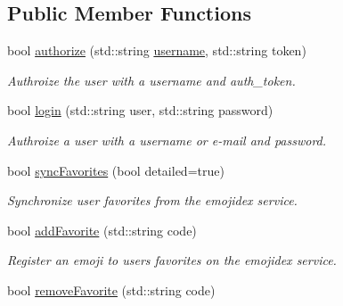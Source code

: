 \subsection*{Public Member Functions}
\begin{DoxyCompactItemize}
\item 
bool \hyperlink{classEmojidex_1_1Service_1_1User_a909f2f2858ed1978476fcc9e2f7b32c5}{authorize} (std\+::string \hyperlink{classEmojidex_1_1Service_1_1User_a5bb9d033735aa9f82fa666f811f48743}{username}, std\+::string token)\hypertarget{classEmojidex_1_1Service_1_1User_a909f2f2858ed1978476fcc9e2f7b32c5}{}\label{classEmojidex_1_1Service_1_1User_a909f2f2858ed1978476fcc9e2f7b32c5}

\begin{DoxyCompactList}\small\item\em Authroize the user with a username and auth\+\_\+token. \end{DoxyCompactList}\item 
bool \hyperlink{classEmojidex_1_1Service_1_1User_a44800534bd40a64caf35fc5fb93298c5}{login} (std\+::string user, std\+::string password)\hypertarget{classEmojidex_1_1Service_1_1User_a44800534bd40a64caf35fc5fb93298c5}{}\label{classEmojidex_1_1Service_1_1User_a44800534bd40a64caf35fc5fb93298c5}

\begin{DoxyCompactList}\small\item\em Authroize a user with a username or e-\/mail and password. \end{DoxyCompactList}\item 
bool \hyperlink{classEmojidex_1_1Service_1_1User_a4fd708d672d09325c07b72bae81bab10}{sync\+Favorites} (bool detailed=true)
\begin{DoxyCompactList}\small\item\em Synchronize user favorites from the emojidex service. \end{DoxyCompactList}\item 
bool \hyperlink{classEmojidex_1_1Service_1_1User_a69799b874e057eefccd36fdaae42695d}{add\+Favorite} (std\+::string code)\hypertarget{classEmojidex_1_1Service_1_1User_a69799b874e057eefccd36fdaae42695d}{}\label{classEmojidex_1_1Service_1_1User_a69799b874e057eefccd36fdaae42695d}

\begin{DoxyCompactList}\small\item\em Register an emoji to users favorites on the emojidex service. \end{DoxyCompactList}\item 
bool \hyperlink{classEmojidex_1_1Service_1_1User_a0f05215cbff6feacbe29ce9d7f1c2e17}{remove\+Favorite} (std\+::string code)\hypertarget{classEmojidex_1_1Service_1_1User_a0f05215cbff6feacbe29ce9d7f1c2e17}{}\label{classEmojidex_1_1Service_1_1User_a0f05215cbff6feacbe29ce9d7f1c2e17}


\end{DoxyCompactItemize}

